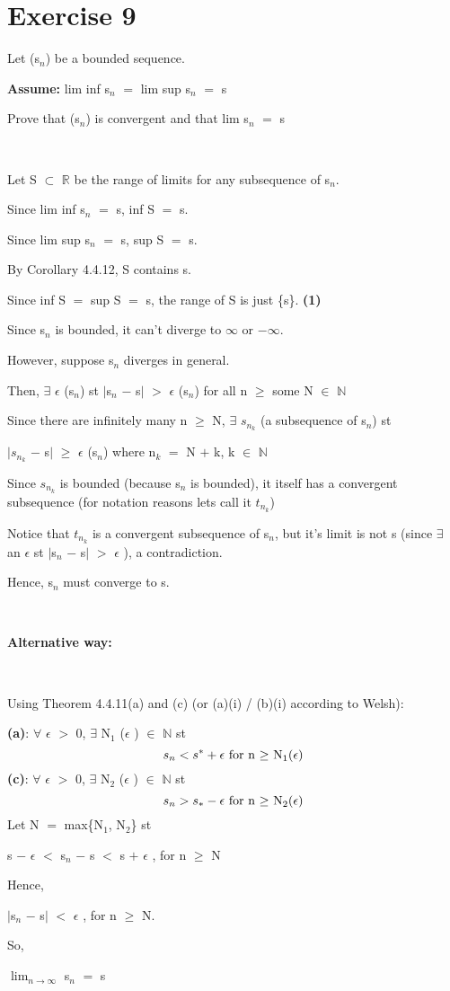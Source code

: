 \documentclass{article}
\newcommand{\mt}[1]{\ensuremath{#1}}
\newcommand\bsc[2][\DefaultOpt]{%
  \def\DefaultOpt{#2}%
  \section[#1]{#2}%
}
\newcommand{\as}[1]{\textbf{Assume: } #1}
\newcommand{\bpth}[1]{\textbf{(#1)}}
\newcommand{\dbs}[3]{\mt{#1_{#2_#3}}}
\newcommand{\br}{\mt{\mathbb{R}} }       %
\newcommand{\bn}{\mt{\mathbb{N}} }       %
\newcommand{\ep}{\mt{\epsilon} }         %
\newcommand{\fa}{\mt{\forall} }          %
\newcommand{\mem}{\mt{\in} }
\newcommand{\exs}{\mt{\exists} }
\newcommand{\sbs}{\mt{\subset} }         %
\newcommand{\av}[1]{\mt{|}#1\mt{|}}  %
\newcommand{\prn}[1]{(#1)}
\newcommand{\bk}[1]{\{#1\}}
\newcommand{\ps}{\mt{+} }
\newcommand{\ms}{\mt{-} }
\newcommand{\ls}{\mt{<} }
\newcommand{\gr}{\mt{>} }
\newcommand{\gre}{\mt{\geq} }
\newcommand{\eql}{\mt{=} }
\newcommand{\uw}[2]{#1\mt{_{#2}}}
\newcommand{\lmti}[1]{\mt{\displaystyle{\lim_{#1 \to \infty}}}}
\newcommand{\eqn}[1]{\[#1\]}
\newcommand{\infy}{\mt{\infty} }
\begin{document}
\bsc{Exercise 9}{

Let \prn{\uw{s}{n}} be a bounded sequence.

\as{lim inf \uw{s}{n} \eql lim sup \uw{s}{n} \eql s}

Prove that \prn{\uw{s}{n}} is convergent and that lim \uw{s}{n} \eql s

\

Let S \sbs \br be the range of limits for any subsequence of \uw{s}{n}.

Since lim inf \uw{s}{n} \eql s, inf S \eql s.

Since lim sup \uw{s}{n} \eql s, sup S \eql s.

By Corollary 4.4.12, S contains s.

Since inf S \eql sup S \eql s, the range of S is just \bk{s}. \bpth{1}

Since \uw{s}{n} is bounded, it can't diverge to \infy or $-\infty$.

However, suppose \uw{s}{n} diverges in general.

Then, \exs \ep(\uw{s}{n}) st \av{\uw{s}{n} \ms s} \gr \ep(\uw{s}{n}) for all n \gre some N \mem \bn

Since there are infinitely many n \gre N, \exs \dbs{s}{n}{k} (a subsequence of \uw{s}{n}) st 

\av{\dbs{s}{n}{k} \ms s} \gre \ep(\uw{s}{n}) where \uw{n}{k} \eql N \ps k, k \mem \bn

Since \dbs{s}{n}{k} is bounded (because \uw{s}{n} is bounded), it itself has a convergent subsequence (for notation reasons lets call it \dbs{t}{n}{k})

Notice that \dbs{t}{n}{k} is a convergent subsequence of \uw{s}{n}, but it's limit is not s (since \exs an \ep st \av{\uw{s}{n} \ms s} \gr \ep), a contradiction.

Hence, \uw{s}{n} must converge to s.

\

\textbf{Alternative way:}

\

Using Theorem 4.4.11(a) and (c) (or (a)(i) / (b)(i) according to Welsh):

\bpth{a}: \fa \ep \gr 0, \exs \uw{N}{1} (\ep) \mem \bn st
\eqn{s_n < s^* + \epsilon \textrm{ for n \gre N}_1(\epsilon)}
\bpth{c}: \fa \ep \gr 0, \exs \uw{N}{2} (\ep) \mem \bn st
\eqn{s_n > s_* - \epsilon \textrm{ for n \gre N}_2(\epsilon)}
Let N \eql max\bk{\uw{N}{1}, \uw{N}{2}} st

s \ms \ep \ls \uw{s}{n} \ms s \ls s \ps \ep, for n \gre N

Hence,

\av{\uw{s}{n} \ms s} \ls \ep, for n \gre N.

So,

\lmti{n} \uw{s}{n} \eql s
}
\end{document}
